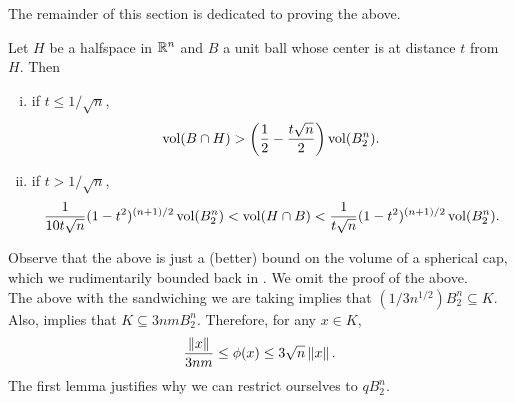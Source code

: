 The remainder of this section is dedicated to proving the above.

\begin{lemma}
	\label{better bound on spherical caps}
	Let $H$ be a halfspace in $\mathbb{R}^n$ and $B$ a unit ball whose center is at distance $t$ from $H$. Then
	\begin{enumerate}[(i)]
		\item if $t\leq 1/\sqrt{n}$,
		\[ \operatorname{vol}(B\cap H) > \left(\frac{1}{2} - \frac{t\sqrt{n}}{2}\right)\operatorname{vol}(B_2^n). \]
		\item if $t>1/\sqrt{n}$,
		\[ \frac{1}{10t\sqrt{n}}(1-t^2)^{(n+1)/2}\operatorname{vol}(B_2^n) < \operatorname{vol}(H\cap B) < \frac{1}{t\sqrt{n}}(1-t^2)^{(n+1)/2}\operatorname{vol}(B_2^n). \]
	\end{enumerate}
\end{lemma}

Observe that the above is just a (better) bound on the volume of a spherical cap, which we rudimentarily bounded back in . We omit the proof of the above.\\

The above with the sandwiching we are taking implies that $(1/3n^{1/2}) B_2^n \subseteq K$. Also,  implies that $K\subseteq 3nmB_2^n$. Therefore, for any $x\in K$,
\begin{equation}
	\label{eqn: 4.21}
	\frac{\left\lVert x\right\rVert}{3nm} \leq \phi(x) \leq 3\sqrt{n}\left\lVert x\right\rVert.
\end{equation}
The first lemma justifies why we can restrict ourselves to $qB_2^n$.

